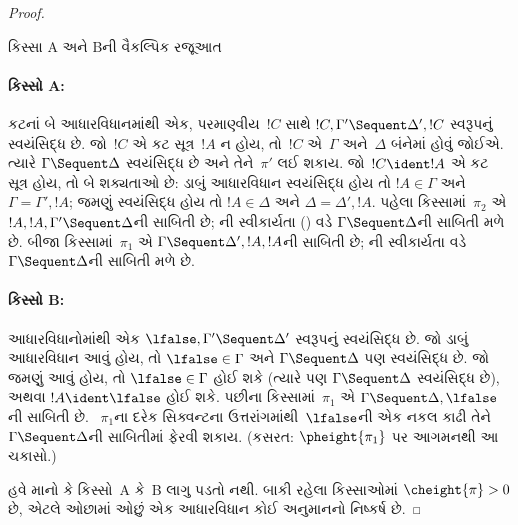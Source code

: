 \begin{proof}
\begin{center}
કિસ્સા A અને Bની વૈકલ્પિક રજૂઆત
\end{center}

\paragraph{કિસ્સો A:}
કટનાં બે આધારવિધાનમાંથી એક,
પરમાણ્વીય~$!C$ સાથે
$!C, \Gamma' \Sequent \Delta', !C$
સ્વરૂપનું સ્વયંસિદ્ધ છે.
જો~$!C$ એ કટ સૂત્ર~$!A$ ન હોય,
તો~$!C$ એ~$\Gamma$ અને~$\Delta$ બંનેમાં
હોવું જોઈએ. ત્યારે
$\Gamma \Sequent \Delta$ સ્વયંસિદ્ધ છે
અને તેને~$\pi'$ લઈ શકાય.
જો~$!C \ident !A$ એ કટ સૂત્ર હોય,
તો બે શક્યતાઓ છે: ડાબું આધારવિધાન સ્વયંસિદ્ધ
હોય તો $!A \in \Gamma$ અને
$\Gamma = \Gamma', !A$;
જમણું સ્વયંસિદ્ધ હોય તો
$!A \in \Delta$ અને
$\Delta = \Delta', !A$.
પહેલા કિસ્સામાં~$\pi_2$ એ
$!A, !A, \Gamma' \Sequent \Delta$ની
સાબિતી છે; \LeftR{\Contraction}ની
સ્વીકાર્યતા
() વડે
$\Gamma \Sequent \Delta$ની સાબિતી મળે છે.
બીજા કિસ્સામાં~$\pi_1$ એ
$\Gamma \Sequent \Delta', !A, !A$ની
સાબિતી છે; \RightR{\Contraction}ની
સ્વીકાર્યતા વડે
$\Gamma \Sequent \Delta$ની સાબિતી મળે છે.

\paragraph{કિસ્સો B:}
આધારવિધાનોમાંથી એક
$\lfalse, \Gamma' \Sequent \Delta'$
સ્વરૂપનું સ્વયંસિદ્ધ છે.
જો ડાબું આધારવિધાન આવું હોય,
તો $\lfalse \in \Gamma$ અને
$\Gamma \Sequent \Delta$ પણ સ્વયંસિદ્ધ છે.
જો જમણું આવું હોય, તો
$\lfalse \in \Gamma$ હોઈ શકે
(ત્યારે પણ $\Gamma \Sequent \Delta$
સ્વયંસિદ્ધ છે), અથવા
$!A \ident \lfalse$ હોઈ શકે.
પછીના કિસ્સામાં~$\pi_1$ એ
$\Gamma \Sequent \Delta, \lfalse$ની
સાબિતી છે. ~$\pi_1$ના દરેક
સિક્વન્ટના ઉત્તરાંગમાંથી~$\lfalse$ની
એક નકલ કાઢી તેને
~$\Gamma \Sequent \Delta$ની
સાબિતીમાં ફેરવી શકાય.
(કસરત: $\pheight{\pi_1}$ પર
આગમનથી આ ચકાસો.)

હવે માનો કે કિસ્સો~A કે~B લાગુ પડતો નથી.
બાકી રહેલા કિસ્સાઓમાં
$\cheight{\pi} > 0$ છે, એટલે
ઓછામાં ઓછું એક આધારવિધાન
કોઈ અનુમાનનો નિષ્કર્ષ છે.


\end{proof}
